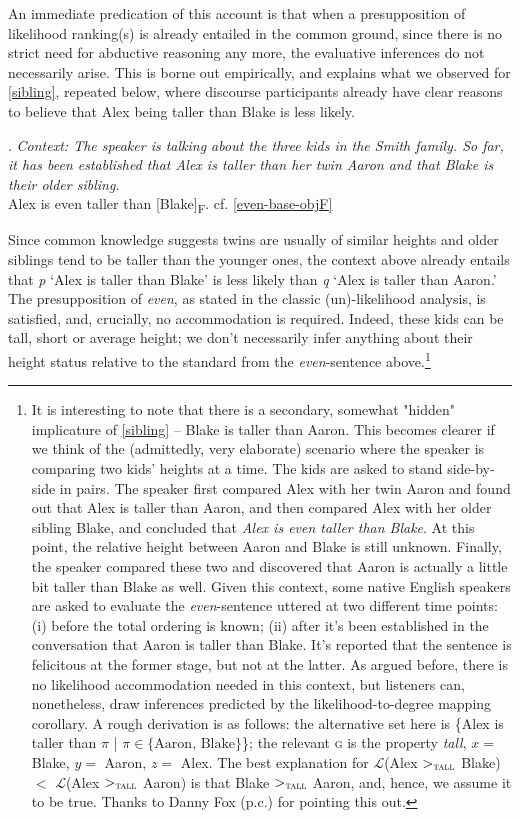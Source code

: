 \documentclass[12pt,letterpaper]{scrartcl}
\makeatletter
\newif\if@repeated\@repeatedfalse
\newcounter{savedExNo}
\newcommand{\exr}[1]{%
\@repeatedtrue
\setcounter{savedExNo}{\value{ExNo}}
\def\tmp@ref{#1}
\ex.}
\newcommand{\alignright}{\hspace*{\fill}}
\newcommand{\sub}[1]{\textsubscript{#1}}
\makeatother
\begin{document}
An immediate predication of this account is that when a presupposition of likelihood ranking(s) is already entailed in the common ground, since there is no strict need for abductive reasoning any more, the evaluative inferences do not necessarily arise. This is borne out empirically, and explains what we observed for \ref{sibling}, repeated below, where discourse participants already have clear reasons to believe that Alex being taller than Blake is less likely.

\exr{sibling} \textit{Context: The speaker is talking about the three kids in the Smith family. So far, it has been established that Alex is taller than her twin Aaron and that Blake is their older sibling.} \\
Alex is even taller than [Blake]\sub{F}. \alignright cf. \ref{even-base-objF}

Since common knowledge suggests twins are usually of similar heights and older siblings tend to be taller than the younger ones, the context above already entails that \textit{p} `Alex is taller than Blake' is less likely than \textit{q} `Alex is taller than Aaron.' The presupposition of \textit{even}, as stated in the classic (un)-likelihood analysis, is satisfied, and, crucially, no accommodation is required. Indeed, these kids can be tall, short or average height; we don't necessarily infer anything about their height status relative to the standard from the \textit{even}-sentence above.\footnote{It is interesting to note that there is a secondary, somewhat "hidden" implicature of \ref{sibling} -- Blake is taller than Aaron. This becomes clearer if we think of the (admittedly, very elaborate) scenario where the speaker is comparing two kids' heights at a time. The kids are asked to stand side-by-side in pairs. The speaker ﬁrst compared Alex with her twin Aaron and found out that Alex is taller than Aaron, and then compared Alex with her older sibling Blake, and concluded that \textit{Alex is even taller than Blake}. At this point, the relative height between Aaron and Blake is still unknown. Finally, the speaker compared these two and discovered that Aaron is actually a little bit taller than Blake as well. Given this context, some native English speakers are asked to evaluate the  \textit{even}-sentence uttered at two different time points: (i) before the total ordering is known; (ii) after it's been established in the conversation that Aaron is taller than Blake. It's reported that the sentence is felicitous at the former stage, but not at the latter. As argued before, there is no likelihood accommodation needed in this context, but listeners can, nonetheless, draw inferences predicted by the likelihood-to-degree mapping corollary. A rough derivation is as follows: the alternative set here is \{Alex is taller than $\pi$ | $\pi \in \{\text{Aaron, Blake}\}$\}; the relevant \textsc{g} is the property \textit{tall}, $x =$ Blake, $y =$ Aaron, $z =$ Alex. The best explanation for $\mathcal{L}$({\scriptsize Alex $>_\textsc{tall}$ Blake}) $<$ $\mathcal{L}$({\scriptsize Alex $>_\textsc{tall}$ Aaron}) is that Blake $>_\textsc{tall}$ Aaron, and, hence, we assume it to be true. Thanks to Danny Fox (p.c.) for pointing this out.}
\end{document}

